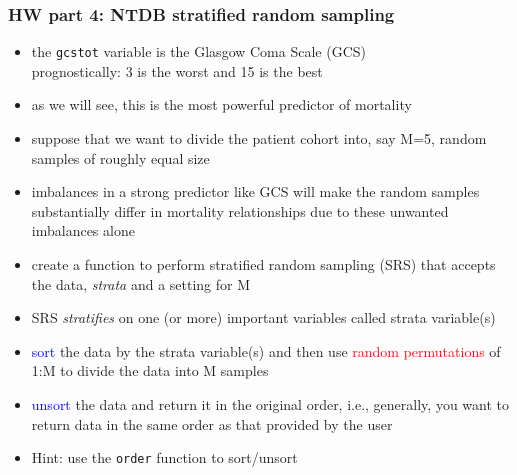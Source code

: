 \documentclass[11pt,pdftex,dvipsnames,usenames,helvetica]{beamer}
\begin{document}
\begin{frame}[fragile]
\frametitle{HW part 4: NTDB stratified random sampling}

\begin{itemize}
\item the {\tt gcstot} variable is the Glasgow Coma Scale (GCS)\\
prognostically: 3 is the worst and 15 is the best
\item as we will see, this is the most powerful predictor of
mortality
\item suppose that we want to divide the patient cohort into, 
say M=5, random samples of roughly equal size
\item imbalances in a strong predictor like GCS will make the
random samples substantially differ in mortality relationships
due to these unwanted imbalances alone 
\item create a function to perform stratified random sampling (SRS)
that accepts the data, {\it strata} and a setting for M
\item SRS {\it stratifies}
on one (or more) important variables called {strata} variable(s)
\item \textcolor{blue}{sort} the data by the strata variable(s) and
  then use \textcolor{red}{random permutations} of 1:M to divide
the data into M samples
\item \textcolor{blue}{unsort} the data and return it in the original 
order, i.e., generally, you want to return data in the same order as
that provided by the user
\item Hint: use the {\tt order} function to sort/unsort
\end{itemize}

\end{frame}
\end{document}
